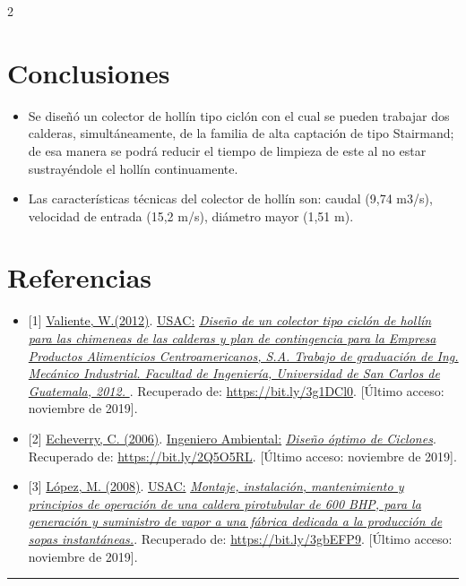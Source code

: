 \documentclass[12pt,spanish,Letterpaper,openany]{book}
\newcommand{\HRule}{\begin{center}\rule{0.5\linewidth}{0.2mm}\end{center}}
\begin{document}
\begin {multicols}{2}
\begin {flushleft}
\end {flushleft}

\hypertarget{conclusiones-4}{%
\section{Conclusiones}\label{conclusiones-4}}

\begin{itemize}
\item
  Se diseñó un colector de hollín tipo ciclón con el cual se pueden trabajar dos calderas, simultáneamente, de la familia de alta captación de tipo Stairmand; de esa manera se podrá reducir el tiempo de limpieza de este al no estar sustrayéndole el hollín continuamente.
\item
  Las características técnicas del colector de hollín son: caudal (9,74 m3/s), velocidad de entrada (15,2 m/s), diámetro mayor (1,51 m).
\end{itemize}

\hypertarget{referencias-4}{%
\section{Referencias}\label{referencias-4}}

\begin{itemize}
\item
  {[}1{]} \href{http://biblioteca.usac.edu.gt/tesis/08/08_0629_MI.pdf}{Valiente, W.(2012)}. \href{http://biblioteca.usac.edu.gt/}{USAC:} \href{http://biblioteca.usac.edu.gt/tesis/08/08_0629_MI.pdf}{\emph{Diseño de un colector tipo ciclón de hollín para las chimeneas de las calderas y plan de contingencia para la Empresa Productos Alimenticios Centroamericanos, S.A. Trabajo de graduación de Ing. Mecánico Industrial. Facultad de Ingeniería, Universidad de San Carlos de Guatemala, 2012. }}. Recuperado de: \url{https://bit.ly/3g1DCl0}. {[}Último acceso: noviembre de 2019{]}.
\item
  {[}2{]} \href{http://www.ingenieroambiental.com/4014/ciclones.pdf}{Echeverry, C. (2006)}. \href{http://www.ingenieroambiental.com/}{Ingeniero Ambiental:} \href{http://www.ingenieroambiental.com/4014/ciclones.pdf}{\emph{Diseño óptimo de Ciclones}}. Recuperado de: \url{https://bit.ly/2Q5O5RL}. {[}Último acceso: noviembre de 2019{]}.
\item
  {[}3{]} \href{http://biblioteca.usac.edu.gt/tesis/08/08_0466_MI.pdf}{López, M. (2008)}. \href{http://biblioteca.usac.edu.gt/}{USAC:} \href{http://biblioteca.usac.edu.gt/tesis/08/08_0466_MI.pdf}{\emph{Montaje, instalación, mantenimiento y principios de operación de una caldera pirotubular de 600 BHP, para la generación y suministro de vapor a una fábrica dedicada a la producción de sopas instantáneas.}}. Recuperado de: \url{https://bit.ly/3gbEFP9}. {[}Último acceso: noviembre de 2019{]}.
\end{itemize}

\end {multicols}

\medskip

\HRule

\medskip







\end{document}
